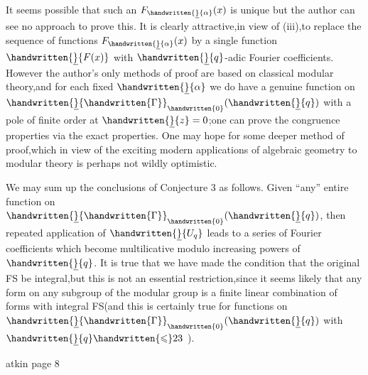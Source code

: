It seems possible that such an $F_{\handwritten{\underline}{\alpha}}(x)$ is unique but the author can see no approach to prove this. It is clearly attractive,in view of (iii),to replace the sequence of functions $F_{\handwritten{\underline}{\alpha}}(x)$ by a single function $\handwritten{\underline}{F(x)}$ with $\handwritten{\underline}{q}$-adic Fourier coefficients. However the author's only methods of proof are based on classical modular theory,and for each fixed $\handwritten{\underline}{\alpha}$ we do have a genuine function on $\handwritten{\underline}{\handwritten{\Gamma}}_{\handwritten{0}}(\handwritten{\underline}{q})$ with a pole of finite order at $\handwritten{\underline}{z}=0$;one can prove the congruence properties via the exact properties. One may hope for some deeper method of proof,which in view of the exciting modern applications of algebraic geometry to modular theory is perhaps not wildly optimistic.

We may sum up the conclusions of Conjecture 3 as follows. Given ``any'' entire function on $\handwritten{\underline}{\handwritten{\Gamma}}_{\handwritten{0}}(\handwritten{\underline}{q})$, then repeated application of $\handwritten{\underline}{U_q}$ leads to a series of Fourier coefficients which become multilicative modulo increasing powers of $\handwritten{\underline}{q}$. It is true that we have made the condition that the original FS be integral,but this is not an essential restriction,since it seems likely that any form on any  subgroup of the modular group is a finite linear combination of forms with integral FS(and this is certainly true for functions on $\handwritten{\underline}{\handwritten{\Gamma}}_{\handwritten{0}}(\handwritten{\underline}{q})$ with $\handwritten{\underline}{q}\handwritten{\leqslant}23$ ).
\par\noindent\hspace*{.25\linewidth}

\begin{flushright}atkin page 8\end{flushright}

